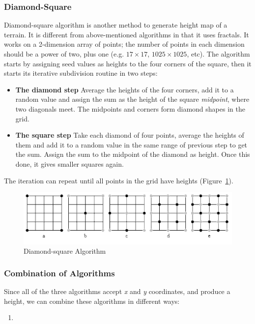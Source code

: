 \subsubsection{Diamond-Square}
Diamond-square algorithm is another method to generate height map of a terrain. It is different from above-mentioned algorithms in that it uses fractals. It works on a 2-dimension array of points; the number of points in each dimension should be a power of two, plus one (e.g. $17 \times 17$, $1025 \times 1025$, etc). The algorithm starts by assigning seed values as heights to the four corners of the square, then it starts its iterative subdivision routine in two steps:
\begin{itemize}
	\item \textbf{The diamond step} Average the heights of the four corners, add it to a random value and assign the sum as the height of the square \textit{midpoint}, where two diagonals meet. The midpoints and corners form diamond shapes in the grid.
	\item \textbf{The square step} Take each diamond of four points, average the heights of them and add it to a random value in the same range of previous step to get the sum. Assign the sum to the midpoint of the diamond as height. Once this done, it gives smaller squares again.
\end{itemize}
The iteration can repeat until all points in the grid have heights (Figure~\ref{fig:dsa}).
\begin{figure}
	\center
	\includegraphics[scale=0.5]{dsa.png}
	\caption{Diamond-square Algorithm}
	\label{fig:dsa}
\end{figure}

\subsubsection{Combination of Algorithms}
Since all of the three algorithms accept \textit{x} and \textit{y} coordinates, and produce a height, we can combine these algorithms in different ways:
\begin{enumerate}
	\item 
\end{enumerate}
